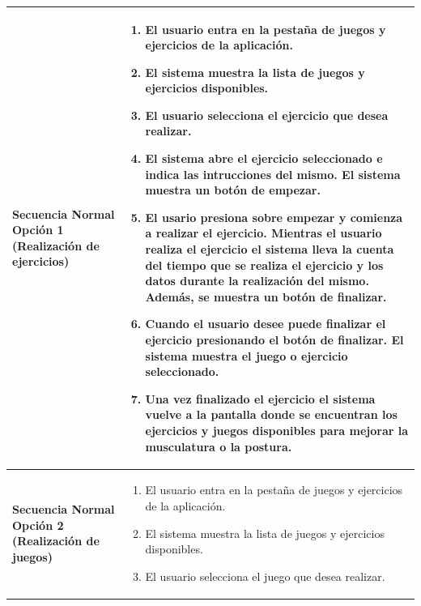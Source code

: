 \begin{table}[h!]
\centering
\begin{tabular}{ |m{4cm}|m{11cm}|  } 
\hline 
\cellcolor[HTML]{EFEFEF}\textbf{Secuencia \newline Normal Opción 1 \newline(Realización de ejercicios)}                &                 
        \begin{enumerate}
			\def\labelenumi{\arabic{enumi}.}
			\tightlist
			\item El usuario entra en la pestaña de juegos y ejercicios
                de la aplicación.
                \item El sistema muestra la lista de juegos y ejercicios disponibles.
                \item El usuario selecciona el ejercicio que desea realizar.
                \item El sistema abre el ejercicio seleccionado e indica las intrucciones del mismo. El sistema muestra un botón de empezar.
                \item El usario presiona sobre empezar y comienza a realizar el ejercicio. Mientras el usuario realiza el ejercicio el sistema lleva la cuenta del tiempo que se realiza el ejercicio y los datos durante la realización del mismo. Además, se muestra un botón de finalizar.
			\item Cuando el usuario desee puede finalizar el ejercicio        presionando el botón de finalizar. El sistema muestra el          juego o ejercicio seleccionado. 
                \item Una vez finalizado el ejercicio el sistema vuelve a la pantalla donde se encuentran los ejercicios y juegos disponibles para mejorar la musculatura o la postura. 
		\end{enumerate}\\
\hline
\cellcolor[HTML]{EFEFEF}\textbf{Secuencia \newline Normal Opción 2 \newline(Realización de juegos)}                &                 
        \begin{enumerate}
			\def\labelenumi{\arabic{enumi}.}
			\tightlist
			\item El usuario entra en la pestaña de juegos y ejercicios       de la aplicación.
                \item El sistema muestra la lista de juegos y ejercicios disponibles.
                \item El usuario selecciona el juego que desea realizar.

\end{enumerate}
\end{tabular}
\end{table}
